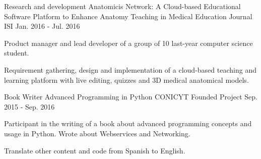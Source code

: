 \begin{cventries}
  \cventry
    {Research and development}
    {Anatomicis Network: A Cloud-based Educational Software Platform to Enhance Anatomy Teaching in Medical Education}
    {Journal ISI}
    {Jan. 2016 - Jul. 2016}
    {
      \begin{cvitems}
        \item {Product manager and lead developer of a group of 10 last-year computer science student.}
        \item {Requirement gathering, design and implementation of a cloud-based teaching and learning platform with live editing, quizzes and 3D medical anatomical models.}
      \end{cvitems}
    }
  \cventry
    {Book Writer}
    {Advanced Programming in Python}
    {CONICYT Founded Project}
    {Sep. 2015 - Sep. 2016}
    {
      \begin{cvitems}
        \item {Participant in the writing of a book about advanced programming concepts and usage in Python. Wrote about Webservices and Networking.}
        \item {Translate other content and code from Spanish to English.}
      \end{cvitems}
    }
\end{cventries}
